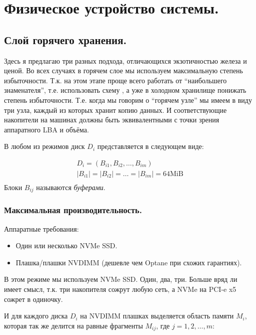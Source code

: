 \documentclass[a4paper,12pt]{article}
\begin{document}
    \newpage


    \section{Физическое устройство системы.}

    \subsection{Слой горячего хранения.}

    Здесь я предлагаю три разных подхода, отличающихся экзотичностью железа и ценой. Во всех случаях в горячем слое мы используем максимальную степень избыточности.
    Т.к. на этом этапе проще всего работать от \enquote{наибольшего знаменателя}, т.е. использовать схему , а уже в холодном хранилище понижать степень избыточности.
    Т.е. когда мы говорим о \enquote{горячем узле} мы имеем в виду три узла, каждый из которых хранит копию данных. И соответствующие накопители на машинах должны быть
    эквивалентными с точки зрения аппаратного LBA и объёма.

    В любом из режимов диск $D_i$ представляется в следующем виде:

    \begin{gather*}
        D_i = \left(B_{i1}, B_{i2}, \dots, B_{im}\right)\\
        |B_{i1}| = |B_{i2}| = \dots = |B_{im}| = 64\text{MiB}\\
    \end{gather*}
    Блоки $B_{ij}$ называются \textit{буферами}.

    \subsubsection{Максимальная производительность.}

    Аппаратные требования:

    \begin{itemize}
        \item Один или несколько NVMe SSD.
        \item Плашка/плашки NVDIMM (дешевле чем Optane при схожих гарантиях).
    \end{itemize}

    В этом режиме мы используем NVMe SSD. Один, два, три. Больше вряд ли имеет смысл, т.к. три накопителя сожрут любую сеть, а NVMe на PCI-e x5 сожрет в одиночку.


    \smallskip
    И для каждого диска $D_i$ на NVDIMM плашках выделяется область памяти $M_i$, которая так же делится на равные фрагменты $M_{ij}$, где $j = 1, 2, \dots, m$:
\end{document}
